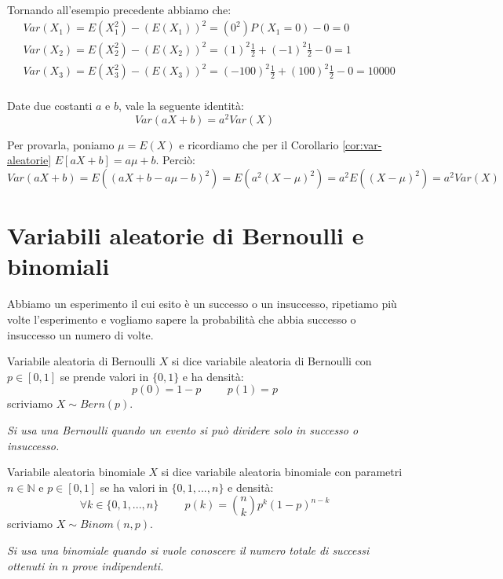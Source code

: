 Tornando all'esempio precedente abbiamo che:
\begin{align*}
    &Var(X_1)=E(X_1^2)-(E(X_1))^2=(0^2)P(X_1=0)-0=0\\
    &Var(X_2)=E(X_2^2)-(E(X_2))^2=(1)^2\frac{1}{2}+(-1)^2\frac{1}{2}-0=1\\
    &Var(X_3)=E(X_3^2)-(E(X_3))^2=(-100)^2\frac{1}{2}+(100)^2\frac{1}{2}-0=10000\\
\end{align*}

\begin{Lemma}{}{}
    Date due costanti $a$ e $b$, vale la seguente identità:
    \begin{equation*}
        Var(aX+b)=a^2Var(X)
    \end{equation*}
    \begin{demonstration}
        Per provarla, poniamo $\mu = E(X)$ e ricordiamo che per il Corollario \ref{cor:var-aleatorie} $E[aX + b] = a\mu + b$. Perciò:
        \begin{equation*}
            Var (aX + b) = E((aX + b - a\mu-b)^2) = E(a^2(X-\mu)^2) = a^2E((X-\mu)^2)=a^2Var(X)
        \end{equation*}
    \end{demonstration}
\end{Lemma}

\section{Variabili aleatorie di Bernoulli e binomiali}
Abbiamo un esperimento il cui esito è un successo o un insuccesso, ripetiamo più volte l'esperimento e vogliamo sapere la probabilità che abbia successo o insuccesso un numero di volte.

\begin{Definition}{Variabile aleatoria di Bernoulli}{}
    $X$ si dice variabile aleatoria di Bernoulli con $p\in[0,1]$ se prende valori in $\{0,1\}$ e ha densità:
    \begin{equation*}
        p(0)=1-p\hspace{1cm}p(1)=p
    \end{equation*}
    scriviamo $X\sim Bern(p)$. 
    
    \textit{Si usa una Bernoulli quando un evento si può dividere solo in successo o insuccesso.}
\end{Definition}

\begin{Definition}{Variabile aleatoria binomiale}{}
    $X$ si dice variabile aleatoria binomiale con parametri $n\in\mathbb{N}$ e $p\in[0,1]$ se ha valori in $\{0,1,...,n\}$ e densità:
    \begin{equation*}
        \forall k\in\{0,1,...,n\}\hspace{1cm}p(k)=\binom{n}{k}p^k(1-p)^{n-k}
    \end{equation*}
    scriviamo $X\sim Binom(n,p)$. 
    
    \textit{Si usa una binomiale quando si vuole conoscere il numero totale di successi ottenuti in $n$ prove indipendenti.}
\end{Definition}

